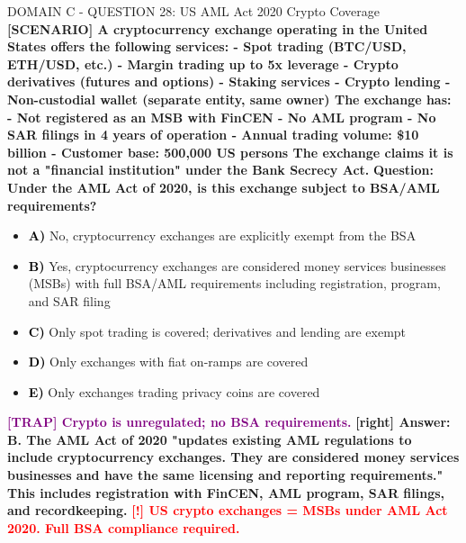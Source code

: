\documentclass[11pt,a4paper]{beamer}
\newcommand{\redflag}[1]{\textcolor{red}{\textbf{[!] #1}}}
\newcommand{\trap}[1]{\textcolor{purple}{\textbf{[TRAP] #1}}}
\newcommand{\correct}[1]{\textcolor{green!50!black}{\textbf{[right] #1}}}
\newcommand{\scenario}[1]{\textcolor{blue!70!black}{\textbf{[SCENARIO] #1}}}
\newcommand{\option}[1]{\textcolor{black}{\textbf{#1}}}
\begin{document}
\begin{frame}{DOMAIN C - QUESTION 28: US AML Act 2020 Crypto Coverage}
\scenario{A cryptocurrency exchange operating in the United States offers the following services:
- Spot trading (BTC/USD, ETH/USD, etc.)
- Margin trading up to 5x leverage
- Crypto derivatives (futures and options)
- Staking services
- Crypto lending
- Non-custodial wallet (separate entity, same owner)
The exchange has:
- Not registered as an MSB with FinCEN
- No AML program
- No SAR filings in 4 years of operation
- Annual trading volume: \$10 billion
- Customer base: 500,000 US persons
The exchange claims it is not a "financial institution" under the Bank Secrecy Act.}
\vspace{0.2cm}
\textbf{Question: Under the AML Act of 2020, is this exchange subject to BSA/AML requirements?}
\vspace{0.1cm}
\begin{itemize}
    \item \option{A)} No, cryptocurrency exchanges are explicitly exempt from the BSA
    \item \option{B)} Yes, cryptocurrency exchanges are considered money services businesses (MSBs) with full BSA/AML requirements including registration, program, and SAR filing
    \item \option{C)} Only spot trading is covered; derivatives and lending are exempt
    \item \option{D)} Only exchanges with fiat on-ramps are covered
    \item \option{E)} Only exchanges trading privacy coins are covered
\end{itemize}
\vspace{0.2cm}
\trap{Crypto is unregulated; no BSA requirements.}
\correct{Answer: B. The AML Act of 2020 "updates existing AML regulations to include cryptocurrency exchanges. They are considered money services businesses and have the same licensing and reporting requirements." This includes registration with FinCEN, AML program, SAR filings, and recordkeeping.}
\redflag{US crypto exchanges = MSBs under AML Act 2020. Full BSA compliance required.}
\end{frame}
\end{document}
